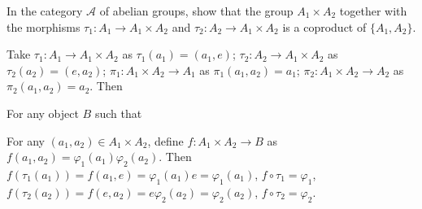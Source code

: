 $$ $$

\begin{ex}
    In the category $\mathcal{A}$ of abelian groups, show that the group $A_{1}\times A_{2}$ together with the morphisms $\tau_{1}:A_{1}\to A_{1}\times A_{2}$ and $\tau_{2}:A_{2}\to A_{1}\times A_{2}$ is a coproduct of $\{A_{1}, A_{2}\}$.
\end{ex}

\begin{answer}
    Take $\tau_{1}:A_{1}\to A_{1}\times A_{2}$ as $\tau_{1}(a_{1})=(a_{1},e)$; $\tau_{2}:A_{2}\to A_{1}\times A_{2}$ as $\tau_{2}(a_{2})=(e,a_{2})$; $\pi_{1}:A_{1}\times A_{2}\to A_{1}$ as $\pi_{1}(a_{1},a_{2})=a_{1}$; $\pi_{2}:A_{1}\times A_{2}\to A_{2}$ as $\pi_{2}(a_{1},a_{2})=a_{2}$. Then

    \begin{figure}[H]\centering
    \end{figure}
    For any object $B$ such that

    \begin{figure}[H]\centering
    \end{figure}
    For any $(a_{1},a_{2})\in A_{1}\times A_{2}$, define $f:A_{1}\times A_{2}\to B$ as $f(a_{1},a_{2})=\varphi_{1}(a_{1})\varphi_{2}(a_{2})$. Then $f(\tau_{1}(a_{1}))=f(a_{1},e)=\varphi_{1}(a_{1})e=\varphi_{1}(a_{1})$, $f\circ \tau_{1}=\varphi_{1}$, $f(\tau_{2}(a_{2}))=f(e,a_{2})=e\varphi_{2}(a_{2})=\varphi_{2}(a_{2})$, $f\circ \tau_{2}=\varphi_{2}$.


\end{answer}
